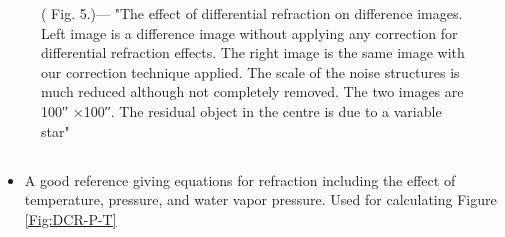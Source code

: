 \documentclass[]{article}
\begin{document}
\begin{figure}[t!]
	\begin{center}
		\caption{(\citeauthor{AlcockDiffIm1999} Fig. 5.)— "The effect of differential refraction on difference images. Left image is a difference image without applying any correction for differential refraction effects. The right image is the same image with our correction technique applied. The scale of the noise structures is much reduced although not completely removed. The two images are 100′′ ×100′′. The residual object in the centre is due to a variable star"}
		\label{Fig:Alcock5}
	\end{center}
\end{figure}

\subsection{\cite{AlejandroPlazas2012}}

\subsection{\cite{Stone1996}}
\begin{itemize}
	\item A good reference giving equations for refraction
          including the effect of temperature, pressure, and water
          vapor pressure. Used for calculating Figure
          \ref{Fig:DCR-P-T}

\end{itemize}
\end{document}
